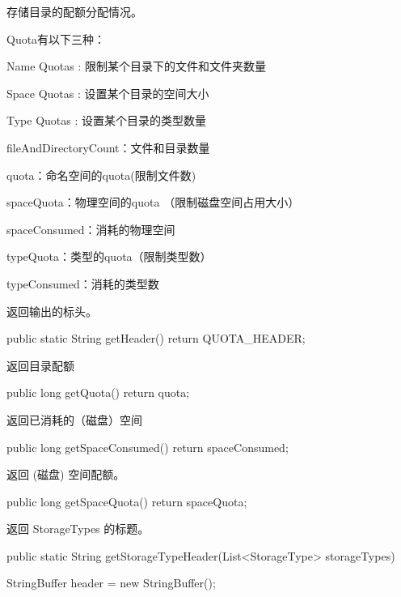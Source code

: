 \begin{java}
存储目录的配额分配情况。

Quota有以下三种：

Name Quotas : 限制某个目录下的文件和文件夹数量

Space Quotas : 设置某个目录的空间大小

Type Quotas : 设置某个目录的类型数量

fileAndDirectoryCount：文件和目录数量

quota：命名空间的quota(限制文件数)

spaceQuota：物理空间的quota （限制磁盘空间占用大小）

spaceConsumed：消耗的物理空间

typeQuota：类型的quota（限制类型数）

typeConsumed：消耗的类型数

返回输出的标头。
\begin{java}
	public static String getHeader() {
	  return QUOTA_HEADER;
	}
\end{java}
返回目录配额
\begin{java}
	public long getQuota() {
	  return quota;
	}
\end{java}
返回已消耗的（磁盘）空间
\begin{java}
	public long getSpaceConsumed() {
	  return spaceConsumed;
	}
\end{java}
返回 (磁盘) 空间配额。
\begin{java}
	public long getSpaceQuota() {
	  return spaceQuota;
	}
\end{java}
返回 StorageTypes 的标题。
\begin{java}
	public static String getStorageTypeHeader(List<StorageType> storageTypes) {
	  StringBuffer header = new StringBuffer();

}
\end{java}
\end{java}

